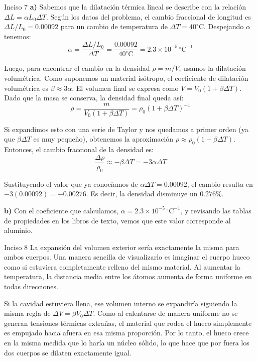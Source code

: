 \documentclass[11pt,letterpaper]{article}
\begin{document}
\begin{inciso}{Inciso 7}
\textbf{a)} Sabemos que la dilatación térmica lineal se describe con la relación $\Delta L = \alpha L_{0} \Delta T$. Según los datos del problema, el cambio fraccional de longitud es $\Delta L / L_{0} = 0.00092$ para un cambio de temperatura de $\Delta T = 40^{\circ}\text{C}$. Despejando $\alpha$ tenemos:
\begin{equation*}
    \alpha = \frac{\Delta L / L_{0}}{\Delta T} = \frac{0.00092}{40^{\circ}\text{C}} = 2.3 \times 10^{-5} \, ^{\circ}\text{C}^{-1}
\end{equation*}

Luego, para encontrar el cambio en la densidad $\rho = m/V$, usamos la dilatación volumétrica. Como suponemos un material isótropo, el coeficiente de dilatación volumétrica es $\beta \approx 3\alpha$. El volumen final se expresa como $V = V_{0}(1 + \beta \Delta T)$. Dado que la masa se conserva, la densidad final queda así:
\begin{equation*}
    \rho = \frac{m}{V_{0}(1 + \beta \Delta T)} = \rho_{0}(1 + \beta \Delta T)^{-1}
\end{equation*}

Si expandimos esto con una serie de Taylor y nos quedamos a primer orden (ya que $\beta \Delta T$ es muy pequeño), obtenemos la aproximación $\rho \approx \rho_{0}(1 - \beta \Delta T)$. Entonces, el cambio fraccional de la densidad es:
\begin{equation*}
    \frac{\Delta \rho}{\rho_{0}} \approx -\beta \Delta T = -3\alpha \Delta T
\end{equation*}

Sustituyendo el valor que ya conocíamos de $\alpha \Delta T = 0.00092$, el cambio resulta en $-3(0.00092) = -0.00276$. Es decir, la densidad disminuye un $0.276\%$.

\textbf{b)} Con el coeficiente que calculamos, $\alpha = 2.3 \times 10^{-5} \, ^{\circ}\text{C}^{-1}$, y revisando las tablas de propiedades en los libros de texto, vemos que este valor corresponde al aluminio.
\end{inciso}
\begin{inciso}{Inciso 8}
La expansión del volumen exterior sería exactamente la misma para ambos cuerpos. Una manera sencilla de visualizarlo es imaginar el cuerpo hueco como si estuviera completamente relleno del mismo material. Al aumentar la temperatura, la distancia media entre los átomos aumenta de forma uniforme en todas direcciones. 

Si la cavidad estuviera llena, ese volumen interno se expandiría siguiendo la misma regla de $\Delta V = \beta V_{0} \Delta T$. Como al calentarse de manera uniforme no se generan tensiones térmicas extrañas, el material que rodea el hueco simplemente es empujado hacia afuera en esa misma proporción. Por lo tanto, el hueco crece en la misma medida que lo haría un núcleo sólido, lo que hace que por fuera los dos cuerpos se dilaten exactamente igual.
\end{inciso}
\end{document}
